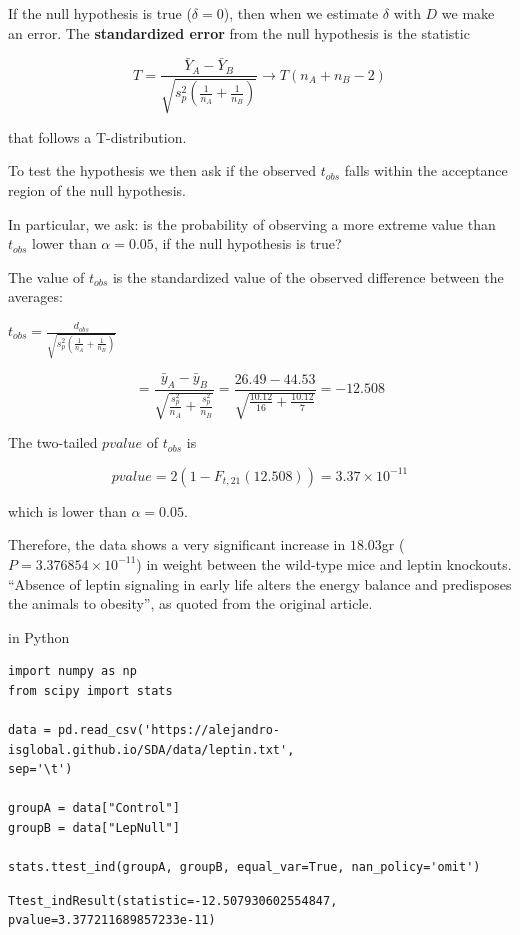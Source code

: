 \documentclass[
]{book}
\begin{document}
If the null hypothesis is true (\(\delta=0\)), then when we estimate \(\delta\) with \(D\) we make an error. The \textbf{standardized error} from the null hypothesis is the statistic

\[T=\frac{\bar{Y}_A-\bar{Y}_B }{\sqrt{s_p^2(\frac{1}{n_A}+\frac{1}{n_B})}} \rightarrow T(n_A+n_B-2)\]

that follows a T-distribution.

To test the hypothesis we then ask if the observed \(t_{obs}\) falls within the acceptance region of the null hypothesis.

In particular, we ask: is the probability of observing a more extreme value than \(t_{obs}\) lower than \(\alpha=0.05\), if the null hypothesis is true?

The value of \(t_{obs}\) is the standardized value of the observed difference between the averages:

\(t_{obs}=\frac{d_{obs}}{\sqrt{s_p^2(\frac{1}{n_A}+\frac{1}{n_B})}}\)

\[=\frac{\bar{y}_A-\bar{y}_B }{\sqrt{\frac{s^2_p}{n_A}+\frac{s^2_p}{n_B}}}=\frac{26.49-44.53}{\sqrt{\frac{10.12}{16}+\frac{10.12}{7}}}=-12.508\]

The two-tailed \(pvalue\) of \(t_{obs}\) is

\[pvalue=2(1-F_{t,21}(12.508))=3.37 \times 10^{-11}\]

which is lower than \(\alpha=0.05\).

Therefore, the data shows a very significant increase in \(18.03\)gr (\(P=3.376854 \times 10^{-11}\)) in weight between the wild-type mice and leptin knockouts. ``Absence of leptin signaling in early life alters the energy balance and predisposes the animals to obesity'', as quoted from the original article.

in Python

\begin{verbatim}
import numpy as np
from scipy import stats

data = pd.read_csv('https://alejandro-isglobal.github.io/SDA/data/leptin.txt', 
sep='\t')

groupA = data["Control"]
groupB = data["LepNull"]

stats.ttest_ind(groupA, groupB, equal_var=True, nan_policy='omit')
\end{verbatim}

\begin{verbatim}
Ttest_indResult(statistic=-12.507930602554847, pvalue=3.377211689857233e-11)
\end{verbatim}
\end{document}
